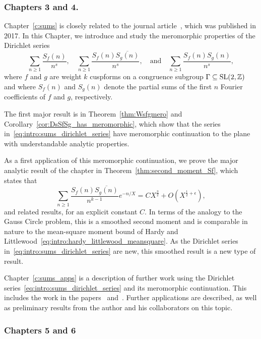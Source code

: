 \subsubsection*{Chapters 3 and 4.}

Chapter~\ref{c:sums} is closely related to the journal article~\cite{hkldw}, which was
published in 2017.
In this Chapter, we introduce and study the meromorphic properties of the Dirichlet series
\begin{equation}\label{eq:intro:sums_dirichlet_series}
  \sum_{n \geq 1} \frac{S_f(n)}{n^s}, \quad \sum_{n \geq 1} \frac{S_f(n)
  \overline{S_g(n)}}{n^s}, \quad \text{and} \quad \sum_{n \geq 1}
  \frac{S_f(n)S_g(n)}{n^s},
\end{equation}
where $f$ and $g$ are weight $k$ cuspforms on a congruence subgroup $\Gamma \subseteq
\operatorname{SL}(2, \mathbb{Z})$ and where $S_f(n)$ and $S_g(n)$ denote the partial sums of the first
$n$ Fourier coefficients of $f$ and $g$, respectively.


The first major result is in Theorem~\ref{thm:Wsfgmero} and
Corollary~\ref{cor:DsSfSg_has_meromorphic}, which show that the series
in~\eqref{eq:intro:sums_dirichlet_series} have meromorphic continuation to the plane with
understandable analytic properties.


As a first application of this meromorphic continuation, we prove the major analytic
result of the chapter in Theorem~\ref{thm:second_moment_Sf}, which states that
\begin{equation}
  \sum_{n \geq 1} \frac{S_f(n) \overline{S_g(n)}}{n^{k-1}} e^{-n/X} = C X^{\frac{3}{2}} +
  O(X^{\frac{1}{2} + \epsilon}),
\end{equation}
and related results, for an explicit constant $C$.
In terms of the analogy to the Gauss Circle problem, this is a smoothed second moment and
is comparable in nature to the mean-square moment bound of Hardy and
Littlewood~\eqref{eq:intro:hardy_littlewood_meansquare}.
As the Dirichlet series in~\eqref{eq:intro:sums_dirichlet_series} are new, this smoothed
result is a new type of result.


Chapter~\ref{c:sums_apps} is a description of further work using the Dirichlet
series~\eqref{eq:intro:sums_dirichlet_series} and its meromorphic continuation.
This includes the work in the papers~\cite{hkldwShort} and~\cite{hkldwSigns}.
Further applications are described, as well as preliminary results from the author and his
collaborators on this topic.




\subsubsection*{Chapters 5 and 6}

